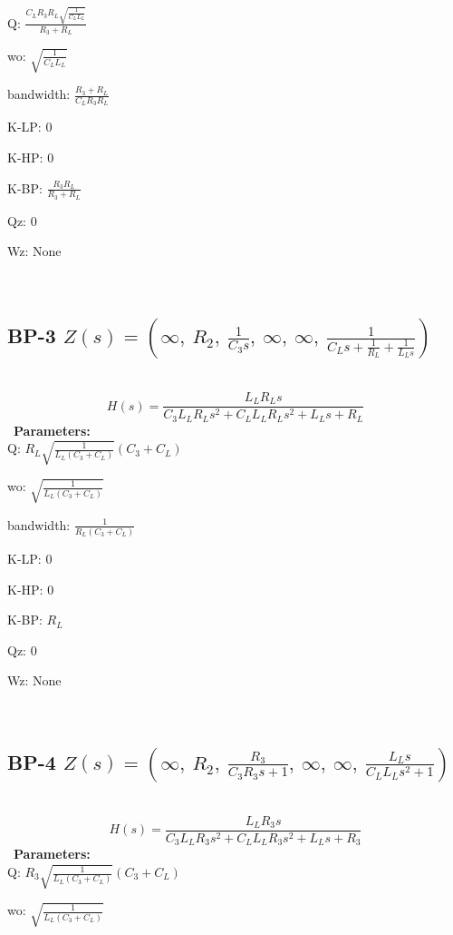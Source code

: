 \documentclass{article}
\begin{document}
Q: $\frac{C_{L} R_{3} R_{L} \sqrt{\frac{1}{C_{L} L_{L}}}}{R_{3} + R_{L}}$\ 

wo: $\sqrt{\frac{1}{C_{L} L_{L}}}$\ 

bandwidth: $\frac{R_{3} + R_{L}}{C_{L} R_{3} R_{L}}$\ 

K-LP: $0$\ 

K-HP: $0$\ 

K-BP: $\frac{R_{3} R_{L}}{R_{3} + R_{L}}$\ 

Qz: $0$\ 

Wz: $\text{None}$\ 

\ 

\subsection{BP-3 $Z(s) = \left( \infty, \  R_{2}, \  \frac{1}{C_{3} s}, \  \infty, \  \infty, \  \frac{1}{C_{L} s + \frac{1}{R_{L}} + \frac{1}{L_{L} s}}\right)$ } \ 
\textbf{\[H(s) = \frac{L_{L} R_{L} s}{C_{3} L_{L} R_{L} s^{2} + C_{L} L_{L} R_{L} s^{2} + L_{L} s + R_{L}}\] } \ 
\textbf{Parameters:}\\ 

Q: $R_{L} \sqrt{\frac{1}{L_{L} \left(C_{3} + C_{L}\right)}} \left(C_{3} + C_{L}\right)$\ 

wo: $\sqrt{\frac{1}{L_{L} \left(C_{3} + C_{L}\right)}}$\ 

bandwidth: $\frac{1}{R_{L} \left(C_{3} + C_{L}\right)}$\ 

K-LP: $0$\ 

K-HP: $0$\ 

K-BP: $R_{L}$\ 

Qz: $0$\ 

Wz: $\text{None}$\ 

\ 

\subsection{BP-4 $Z(s) = \left( \infty, \  R_{2}, \  \frac{R_{3}}{C_{3} R_{3} s + 1}, \  \infty, \  \infty, \  \frac{L_{L} s}{C_{L} L_{L} s^{2} + 1}\right)$ } \ 
\textbf{\[H(s) = \frac{L_{L} R_{3} s}{C_{3} L_{L} R_{3} s^{2} + C_{L} L_{L} R_{3} s^{2} + L_{L} s + R_{3}}\] } \ 
\textbf{Parameters:}\\ 

Q: $R_{3} \sqrt{\frac{1}{L_{L} \left(C_{3} + C_{L}\right)}} \left(C_{3} + C_{L}\right)$\ 

wo: $\sqrt{\frac{1}{L_{L} \left(C_{3} + C_{L}\right)}}$\ 
\end{document}
